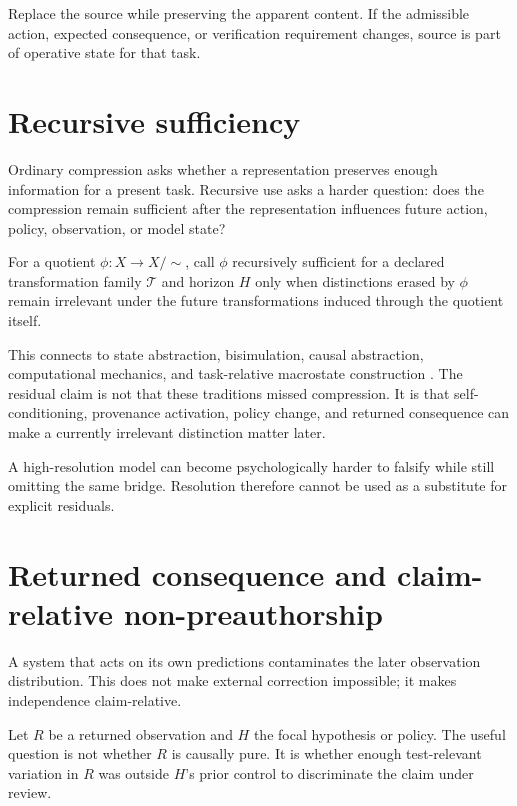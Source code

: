\begin{definition}
Replace the source while preserving the apparent content. If the admissible action, expected consequence, or verification requirement changes, source is part of operative state for that task.
\end{definition}

\section{Recursive sufficiency}

Ordinary compression asks whether a representation preserves enough information for a present task. Recursive use asks a harder question: does the compression remain sufficient after the representation influences future action, policy, observation, or model state?

For a quotient $\phi:X\rightarrow X/{\sim}$, call $\phi$ recursively sufficient for a declared transformation family $\mathcal{T}$ and horizon $H$ only when distinctions erased by $\phi$ remain irrelevant under the future transformations induced through the quotient itself.

This connects to state abstraction, bisimulation, causal abstraction, computational mechanics, and task-relative macrostate construction \cite{GivanDeanGreig2003,LiWalshLittman2006,HoelEtAl2013,Hoel2017,GeigerEtAl2021,GeigerEtAl2023}. The residual claim is not that these traditions missed compression. It is that self-conditioning, provenance activation, policy change, and returned consequence can make a currently irrelevant distinction matter later.

A high-resolution model can become psychologically harder to falsify while still omitting the same bridge. Resolution therefore cannot be used as a substitute for explicit residuals.

\section{Returned consequence and claim-relative non-preauthorship}

A system that acts on its own predictions contaminates the later observation distribution. This does not make external correction impossible; it makes independence claim-relative.

Let $R$ be a returned observation and $H$ the focal hypothesis or policy. The useful question is not whether $R$ is causally pure. It is whether enough test-relevant variation in $R$ was outside $H$'s prior control to discriminate the claim under review.

